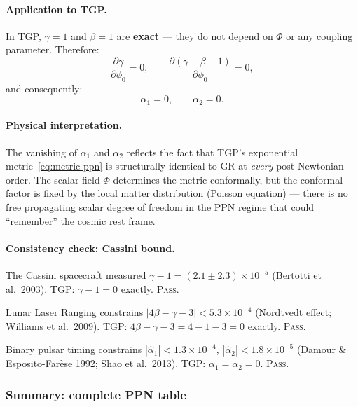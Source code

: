 \paragraph{Application to TGP.}
In TGP, $\gamma = 1$ and $\beta = 1$ are \textbf{exact} ---
they do not depend on $\Phi$ or any coupling parameter.
Therefore:
\begin{equation}
  \frac{\partial\gamma}{\partial\phi_0} = 0,
  \qquad
  \frac{\partial(\gamma - \beta - 1)}{\partial\phi_0} = 0,
\end{equation}
and consequently:
\begin{equation}\label{eq:alpha12}
  \boxed{\alpha_1 = 0, \qquad \alpha_2 = 0.}
\end{equation}

\paragraph{Physical interpretation.}
The vanishing of $\alpha_1$ and $\alpha_2$ reflects the fact that
TGP's exponential metric~\eqref{eq:metric-ppn} is structurally
identical to GR at \emph{every} post-Newtonian order.
The scalar field $\Phi$ determines the metric conformally,
but the conformal factor is fixed by the local matter distribution
(Poisson equation) --- there is no free propagating scalar degree
of freedom in the PPN regime that could ``remember'' the cosmic
rest frame.

\paragraph{Consistency check: Cassini bound.}
The Cassini spacecraft measured $\gamma - 1 = (2.1 \pm 2.3) \times 10^{-5}$
(Bertotti et al.\ 2003).
TGP: $\gamma - 1 = 0$ exactly.
\textsc{Pass.}

Lunar Laser Ranging constrains $|4\beta - \gamma - 3| < 5.3 \times 10^{-4}$
(Nordtvedt effect; Williams et al.\ 2009).
TGP: $4\beta - \gamma - 3 = 4 - 1 - 3 = 0$ exactly.
\textsc{Pass.}

Binary pulsar timing constrains $|\hat\alpha_1| < 1.3 \times 10^{-4}$,
$|\hat\alpha_2| < 1.8 \times 10^{-5}$ (Damour \& Esposito-Far\`ese 1992;
Shao et al.\ 2013).
TGP: $\alpha_1 = \alpha_2 = 0$.
\textsc{Pass.}

\subsubsection{Summary: complete PPN table}

